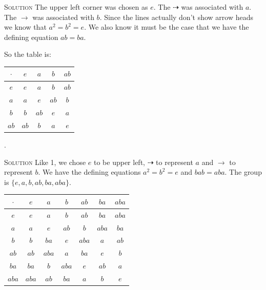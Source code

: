 \documentclass[twoside]{amsart}
\newcommand{\solution}{\textsc{Solution}\xspace}
\begin{document}
\begin{enumerate}[A.]
    \noindent \solution The upper left corner
    was chosen as $e$. The $\dashrightarrow$ was associated with $a$. The
    $\to$ was associated with $b$. Since the lines actually don't show
    arrow heads we know that $a^2=b^2=e$. We also know it must
    be the case that we have the defining equation $ab=ba$.

    So the table is:
    \begin{center}
    \begin{tabular}{c|cccc}
       $\cdot$ & $e$ & $a$ & $b$ & $ab$ \\ \hline
       $e$     & $e$ & $a$ & $b$ & $ab$ \\
       $a$     & $a$ & $e$ & $ab$ & $b$ \\
       $b$     & $b$ & $ab$ & $e$ & $a$ \\
       $ab$    & $ab$ & $b$ & $a$ & $e$
    \end{tabular}
    \end{center}

    . 

    \noindent \solution Like 1, we chose $e$ to be upper left,
    $\dashrightarrow$ to represent $a$ and $\to$ to represent $b$.
    We have the defining equations $a^2=b^2=e$ and $bab=aba$. The
    group is $\{e,a,b,ab,ba,aba\}$.
    \begin{center}
    \begin{tabular}{c|cccccc}
    $\cdot$ & $e$ & $a$ & $b$ & $ab$ & $ba$ & $aba$ \\ \hline
    $e$     & $e$ & $a$ & $b$ & $ab$ & $ba$ & $aba$ \\ 
    $a$     & $a$ & $e$ & $ab$ & $b$ & $aba$ & $ba$ \\
    $b$     & $b$ & $ba$ & $e$ & $aba$ & $a$ & $ab$ \\
    $ab$    & $ab$ & $aba$ & $a$ & $ba$ & $e$ & $b$ \\
    $ba$    & $ba$ & $b$ & $aba$ & $e$ & $ab$ & $a$ \\
    $aba$   & $aba$ & $ab$ & $ba$ & $a$ & $b$ & $e$
    \end{tabular}
    \end{center}


\end{enumerate}
\end{document}
